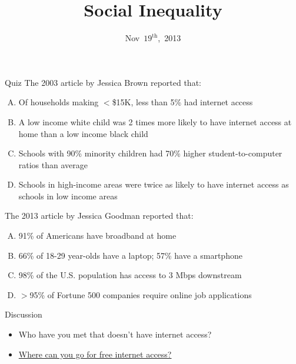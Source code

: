 \documentclass{beamer}
\title{Social Inequality}
\date{Nov~$19^{\text{th}}$,~2013}
\begin{document}
\begin{frame}
\titlepage
\end{frame}

\begin{frame}{Quiz}
The 2003 article by Jessica Brown reported that:
\begin{enumerate}[(A)]
\item<1> Of households making $<$\$15K, less than 5\% had internet access %
\item<1> A low income white child was 2 times more likely to have internet access at home than a low income black child %
\item<1-2> Schools with 90\% minority children had 70\% higher student-to-computer ratios than average %
\item<1> Schools in high-income areas were twice as likely to have internet access as schools in low income areas %
\end{enumerate}
\bigskip
The 2013 article by Jessica Goodman reported that:
\begin{enumerate}[(A)]
\item<1> 91\% of Americans have broadband at home %
\item<1> 66\% of 18-29 year-olds have a laptop; 57\% have a smartphone %
\item<1-2> 98\% of the U.S. population has access to 3 Mbps downstream
\item<1> $>$95\% of Fortune 500 companies require online job applications %
\end{enumerate}
\end{frame}

\begin{frame}{Discussion}
\begin{itemize}
\item Who have you met that doesn't have internet access?
\bigskip
\item \href{http://www.openwifispots.com/FinderDirectoryCity.aspx?City=Birmingham&State=AL}{Where can you go for free internet access?}
\end{itemize}
\end{frame}
\end{document}
